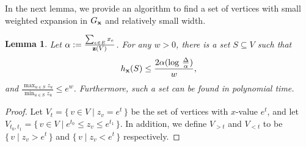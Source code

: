 \documentclass[11pt]{article}
\def\bx{{\bf x}}
\def\bz{{\bf z}}
\def\h{h}
\newcommand{\Set}[2]{
  \{\, #1 \mid #2 \, \}
}
\newtheorem{lemma}{Lemma}[section]
\begin{document}
In the next lemma, we provide an algorithm to find a set of vertices with small weighted expansion in $G_\bx$ and relatively small width. 
\begin{lemma}
\label{lem:nonexpandingset}
Let $\alpha := \frac{\sum_{e \in E} x_e}{\bz(V)}$. For any $w>0$, there is a set $S \subseteq V$ such that $$\h_\bx(S) \leq \dfrac{2\alpha(\log \, \frac{\Delta}{\alpha})}{w},$$ and $\frac{\max_{ u \in S} z_u}{\min_{u \in S} z_u} \leq e^{w}$. Furthermore, such a set can be found in polynomial time. 
\end{lemma}
\begin{proof}Let $V_t =\Set{v \in V}{z_v = e^{t}}$ be the set of vertices with $x$-value $e^{t}$, and let  $V_{t_0,t_1}=
\Set{v \in V}{e^{t_0} \leq z_v \leq e^{t_1}}$. 
In addition, we define $V_{>t}$ and $V_{<t}$ to be $\Set{v}{ z_v > e^{t}}$ and $\Set{v}{z_v < e^{t}}$ respectively. 




\end{proof}
\end{document}
